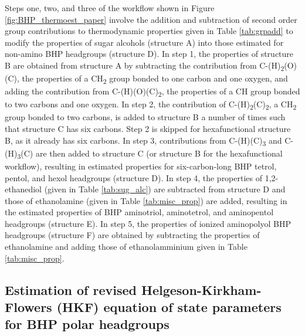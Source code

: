 {\begin{table}
\begin{threeparttable}
\begin{tablenotes}
  \end{tablenotes}
  
  \label{tab:misc_prop}
  \end{threeparttable}
\end{table}
\setcounter{tabcounter}{0} %
\doublespace
\clearpage
}



Steps one, two, and three of the workflow shown in Figure \ref{fig:BHP_thermoest_paper} involve the addition and subtraction of second order group contributions to thermodynamic properties given in Table \ref{tab:grpadd} to modify the properties of sugar alcohols (structure A) into those estimated for non-amino BHP headgroups (structure D). In step 1, the properties of structure B are obtained from structure A by subtracting the contribution from C-(H)\textsubscript{2}(O)(C), the properties of a CH\textsubscript{2} group bonded to one carbon and one oxygen, and adding the contribution from C-(H)(O)(C)\textsubscript{2}, the properties of a CH group bonded to two carbons and one oxygen. In step 2, the contribution of C-(H)\textsubscript{2}(C)\textsubscript{2}, a CH\textsubscript{2} group bonded to two carbons, is added to structure B a number of times such that structure C has six carbons. Step 2 is skipped for hexafunctional structure B, as it already has six carbons. In step 3, contributions from C-(H)(C)\textsubscript{3} and C-(H)\textsubscript{3}(C) are then added to structure C (or structure B for the hexafunctional workflow), resulting in estimated properties for six-carbon-long BHP tetrol, pentol, and hexol headgroups (structure D). In step 4, the properties of 1,2-ethanediol (given in Table \ref{tab:sug_alc}) are subtracted from structure D and those of ethanolamine (given in Table \ref{tab:misc_prop}) are added, resulting in the estimated properties of BHP aminotriol, aminotetrol, and aminopentol headgroups (structure E). In step 5, the properties of ionized aminopolyol BHP headgroups (structure F) are obtained by subtracting the properties of ethanolamine and adding those of ethanolamminium given in Table \ref{tab:misc_prop}.


\subsection{Estimation of revised Helgeson-Kirkham-Flowers (HKF) equation of state parameters for BHP polar headgroups}

